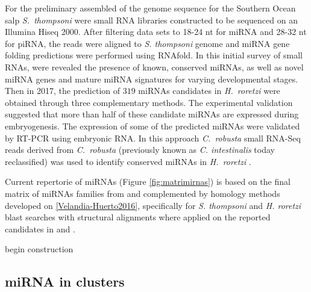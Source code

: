 \documentclass[graybox]{svmult}
\newcommand{\TODO}[1]{\begingroup\color{red}#1\endgroup}
\begin{document}
For the preliminary assembled of the genome sequence for the Southern Ocean
salp \textit{S.\ thompsoni} \cite{Jue2016} were small RNA libraries
constructed to be sequenced on an Illumina Hiseq 2000. After filtering data
sets to 18-24 nt for miRNA and 28-32 nt for piRNA, the reads were aligned
to \textit{S. thompsoni} genome and miRNA gene folding predictions were
performed using RNAfold. In this initial survey of small RNAs, were
revealed the presence of known, conserved miRNAs, as well as novel miRNA
genes and mature miRNA signatures for varying developmental stages. Then in
2017, the prediction of $319$ miRNAs candidates in \textit{H.\ roretzi}
were obtained through three complementary methods. The experimental
validation suggested that more than half of these candidate miRNAs are
expressed during embryogenesis. The expression of some of the predicted
miRNAs were validated by RT-PCR using embryonic RNA. In this approach
\textit{C.\ robusta} small RNA-Seq reads derived from \textit{C.\ robusta}
\cite{Shi2009} (previously known as \textit{C. intestinalis} today
reclassified) was used to identify conserved miRNAs in \textit{H.\ roretzi}
\cite{Wang2017}.

Current repertorie of miRNAs (Figure \ref{fig:matrimirnas}) is based on the
final matrix of miRNAs families from \cite{Hertel:15a} and complemented by
homology methods developed on \ref{Velandia-Huerto2016}, specifically for
\textit{S. thompsoni} and \textit{H. roretzi} blast searches with
structural alignments where applied on the reported candidates in
\cite{Jue2016} and \cite{Wang2017}.

\TODO{begin construction}

\subsection{miRNA in clusters}
\end{document}
